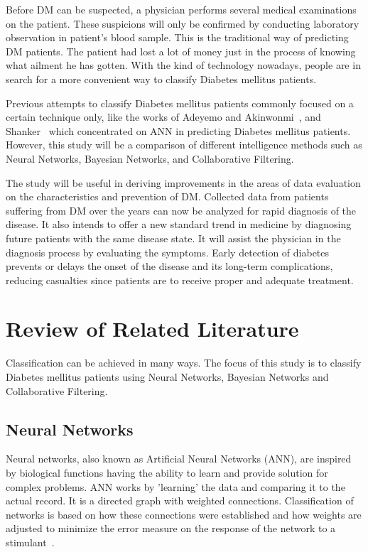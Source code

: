 \documentclass[journal]{./IEEE/IEEEtran}
\begin{document}
	Before DM can be suspected, a physician performs several medical examinations on the patient. These suspicions will only be confirmed by conducting laboratory observation in patient’s blood sample. This is the traditional way of predicting DM patients. The patient had lost a lot of money just in the process of knowing what ailment he has gotten. With the kind of technology nowadays, people are in search for a more convenient way to classify Diabetes mellitus patients.
	
	Previous attempts to classify Diabetes mellitus patients commonly focused on a certain technique only, like the works of Adeyemo and Akinwonmi~\cite{Adeyemo11}, and Shanker~\cite{Shanker96} which concentrated on ANN in predicting Diabetes mellitus patients. However, this study will be a comparison of different intelligence methods such as Neural Networks, Bayesian Networks, and Collaborative Filtering.
 
	The study will be useful in deriving improvements in the areas of data evaluation on the characteristics and prevention of DM. Collected data from patients suffering from DM over the years can now be analyzed for rapid diagnosis of the disease. It also intends to offer a new standard trend in medicine by diagnosing future patients with the same disease state. It will assist the physician in the diagnosis process by evaluating the symptoms. Early detection of diabetes prevents or delays the onset of the disease and its long-term complications, reducing casualties since patients are to receive proper and adequate treatment. 

\section{Review of Related Literature}
	Classification can be achieved in many ways. The focus of this study is to classify Diabetes mellitus patients using Neural Networks, Bayesian Networks and Collaborative Filtering.

\subsection{Neural Networks}
	Neural networks, also known as Artificial Neural Networks (ANN), are inspired by biological functions having the ability to learn and provide solution for complex problems. ANN works by 'learning' the data and comparing it to the actual record. It is a directed graph with weighted connections. Classification of networks is based on how these connections were established and how weights are adjusted to minimize the error measure on the response of the network to a stimulant~\cite{Xu08}.
 
\end{document}
